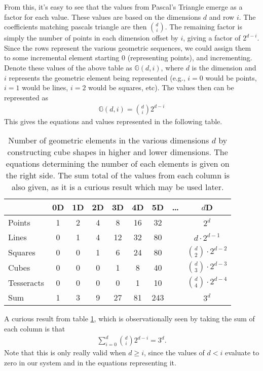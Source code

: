 From this, it's easy to see that the values from Pascal's Triangle emerge as a factor for each value. These values are based on the dimensions $d$ and row $i$. The coefficients matching pascals triangle are then $\binom{d}{i}$. The remaining factor is simply the number of points in each dimension offset by $i$, giving a factor of $2^{d-i}$. Since the rows represent the various geometric sequences, we could assign them to some incremental element starting 0 (representing points), and incrementing. Denote these values of the above table as $\mathbb{G}(d,i)$, where $d$ is the dimension and $i$ represents the geometric element being represented (e.g., $i=0$ would be points, $i=1$ would be lines, $i=2$ would be squares, etc). The values then can be represented as
\begin{align}
	\mathbb{G}(d, i) = \binom{d}{i} 2^{d-i}
\end{align}
This gives the equations and values represented in the following table.
\begin{table}[htbp]
	\centering
	\begin{tabular}{lcccccccc}
		\toprule
		& 0D & 1D & 2D & 3D & 4D & 5D &\dots& \(d\)D \\
		\midrule
		Points     & 1  & 2  & 4  & 8  & 16 & 32 && \(2^d\) \\
		Lines      & 0  & 1  & 4  & 12 & 32 & 80 && \(d \cdot 2^{d-1}\) \\
		Squares    & 0  & 0  & 1  & 6  & 24 & 80 && \(\binom{d}{2} \cdot 2^{d-2}\) \\
		Cubes      & 0  & 0  & 0  & 1  & 8  & 40 && \(\binom{d}{3} \cdot 2^{d-3}\) \\
		Tesseracts & 0  & 0  & 0  & 0  & 1  & 10 && \(\binom{d}{4} \cdot 2^{d-4}\) \\
		\bottomrule
		Sum        & 1  & 3  & 9  & 27  & 81 & 243 && \(3^d\) \\
	\end{tabular}
	\caption{Number of geometric elements in the various dimensions $d$ by constructing cube shapes in higher and lower dimensions. The equations determining the number of each elements is given on the right side. The sum total of the values from each column is also given, as it is a curious result which may be used later.}
	\label{tab:hypercube_elements}
\end{table}
A curious result from table \ref{tab:hypercube_elements}, which is observationally seen by taking the sum of each column is that
\begin{align}
\sum_{i=0}^{d}\binom{d}{i}2^{d-i} = 3^d.
\end{align}
Note that this is only really valid when $d\geq i$, since the values of $d<i$ evaluate to zero in our system and in the equations representing it.















